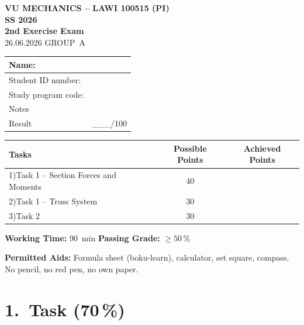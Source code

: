 \documentclass[a4paper,11pt]{article}
\begin{document}

\begin{center}
  {\LARGE\bfseries VU MECHANICS -- LAWI 100515 (PI)\\[4pt]
  SS 2026}\\[10pt]
  {\Large\bfseries 2nd Exercise Exam}\\[4pt]
  {\large 26.06.2026 \quad GROUP~A}
\end{center}

\vspace{6pt}
\begin{center}
\begin{tabular}{|p{4.5cm}|p{8cm}|}
\hline
Name: & \\[8pt] \hline
Student ID number: & \\[8pt] \hline
Study program code: & \\[8pt] \hline
Notes & \\[14pt] \hline
\multicolumn{1}{|l|}{Result} & \hspace{3cm}\_\_\_/100 \\[6pt] \hline
\end{tabular}
\end{center}

\vspace{6pt}
\begin{tabular}{lcc}
\toprule
\textbf{Tasks} & \textbf{Possible Points} & \textbf{Achieved Points} \\
\midrule
1)\;Task 1 -- Section Forces and Moments & 40 & \\
2)\;Task 1 -- Truss System               & 30 & \\
3)\;Task 2                               & 30 & \\
\bottomrule
\end{tabular}

\medskip
\textbf{Working Time:} 90~min\quad
\textbf{Passing Grade:} $\geq 50\,\%$

\textbf{Permitted Aids:} Formula sheet (boku-learn), calculator, set square, compass.
No pencil, no red pen, no own paper.

\newpage
\section*{1.~Task \hfill (70\,\%)}
\end{document}
